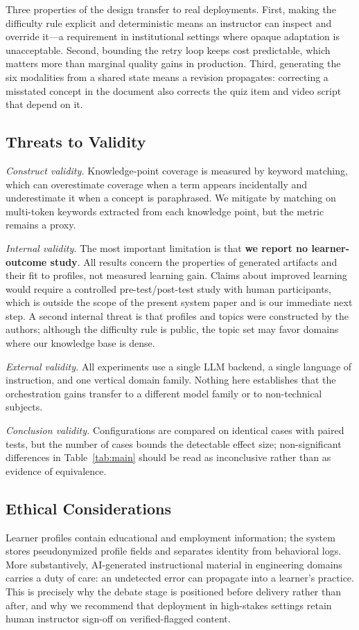 Three properties of the design transfer to real deployments. First, making the
difficulty rule explicit and deterministic means an instructor can inspect and
override it---a requirement in institutional settings where opaque adaptation
is unacceptable. Second, bounding the retry loop keeps cost predictable, which
matters more than marginal quality gains in production. Third, generating the
six modalities from a shared state means a revision propagates: correcting a
misstated concept in the document also corrects the quiz item and video
script that depend on it.

\subsection{Threats to Validity}
\label{ssec:threats}

\emph{Construct validity.} Knowledge-point coverage is measured by keyword
matching, which can overestimate coverage when a term appears incidentally and
underestimate it when a concept is paraphrased. We mitigate by matching on
multi-token keywords extracted from each knowledge point, but the metric
remains a proxy.

\emph{Internal validity.} The most important limitation is that
\textbf{we report no learner-outcome study}. All results concern the
properties of generated artifacts and their fit to profiles, not measured
learning gain. Claims about improved learning would require a controlled
pre-test/post-test study with human participants, which is outside the scope of
the present system paper and is our immediate next step. A second internal
threat is that profiles and topics were constructed by the authors; although
the difficulty rule is public, the topic set may favor domains where our
knowledge base is dense.

\emph{External validity.} All experiments use a single LLM backend, a single
language of instruction, and one vertical domain family. Nothing here
establishes that the orchestration gains transfer to a different model family
or to non-technical subjects.

\emph{Conclusion validity.} Configurations are compared on identical cases with
paired tests, but the number of cases bounds the detectable effect size;
non-significant differences in Table~\ref{tab:main} should be read as
inconclusive rather than as evidence of equivalence.

\subsection{Ethical Considerations}

Learner profiles contain educational and employment information; the system
stores pseudonymized profile fields and separates identity from behavioral
logs. More substantively, AI-generated instructional material in engineering
domains carries a duty of care: an undetected error can propagate into a
learner's practice. This is precisely why the debate stage is positioned
before delivery rather than after, and why we recommend that deployment in
high-stakes settings retain human instructor sign-off on verified-flagged
content.
